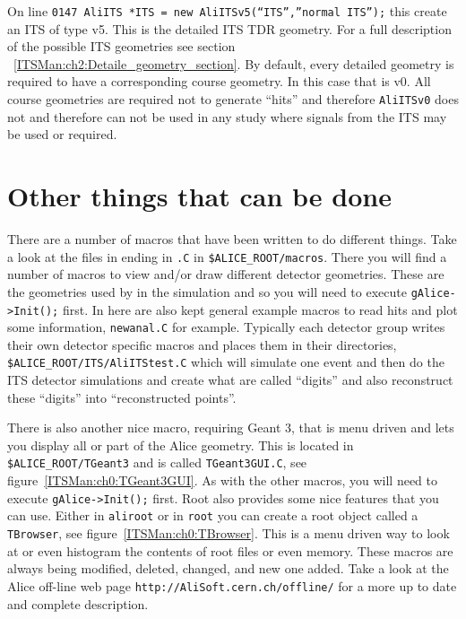 On line \texttt{0147 AliITS *ITS = new AliITSv5(``ITS'',''normal ITS'');} this
create an ITS of type v5. This is the detailed ITS TDR geometry. For a full
description of the possible ITS geometries see section
~\ref{ITSMan:ch2:Detaile_geometry_section}. By default, every detailed geometry
is required to have a corresponding course geometry. In this case that is
v0. All course geometries are required not to generate ``hits'' and therefore
\texttt{AliITSv0} does not and therefore can not be used in any study where
signals from the ITS may be used or required.

\section*{Other things that can be done}

There are a number of macros that have been written to do different
things. Take a look at the files in ending in \texttt{.C} in
\texttt{\$ALICE\_ROOT/macros}. There you will find a number of macros to view
and/or draw different detector geometries. These are the geometries used by in
the simulation and so you will need to execute \texttt{gAlice->Init();}
first. In here are also kept general example macros to read hits and plot some
information, \texttt{newanal.C} for example. Typically each detector group
writes their own detector specific macros and places them in their directories,
\texttt{\$ALICE\_ROOT/ITS/AliITStest.C} which will simulate one event and then
do the ITS detector simulations and create what are called ``digits'' and also
reconstruct these ``digits'' into ``reconstructed points''.

There is also another nice macro, requiring Geant 3, that is menu driven and
lets you display all or part of the Alice geometry. This is located in
\texttt{\$ALICE\_ROOT/TGeant3} and is called \texttt{TGeant3GUI.C}, see
figure~\ref{ITSMan:ch0:TGeant3GUI}. As with the other macros, you will need to
execute \texttt{gAlice->Init();} first. Root also provides some nice features
that you can use. Either in \texttt{aliroot} or in \texttt{root} you can create
a root object called a \texttt{TBrowser}, see
figure~\ref{ITSMan:ch0:TBrowser}. This is a menu driven way to look at or even
histogram the contents of root files or even memory. These macros are always
being modified, deleted, changed, and new one added. Take a look at the Alice
off-line web page \texttt{http://AliSoft.cern.ch/offline/} for a more up to
date and complete description.

\begin{figure*}[htbp]
  \begin{center}
    \leavevmode
    \caption{This shows a typical menu from running \texttt{TGeant3GUI.C}.}
    \label{ITSMan:ch0:TGeant3GUI}
  \end{center}
\end{figure*}

\begin{figure*}[htbp]
  \begin{center}
    \leavevmode
    \caption{This shows a typical TBrowser window.}
    \label{ITSMan:ch0:TBrowser}
  \end{center}
\end{figure*}